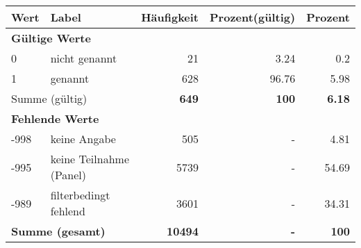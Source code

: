      \begin{longtable}{lXrrr}
     \toprule
     \textbf{Wert} & \textbf{Label} & \textbf{Häufigkeit} & \textbf{Prozent(gültig)} & \textbf{Prozent} \\
     \endhead
     \midrule
     \multicolumn{5}{l}{\textbf{Gültige Werte}}\\

     0 &
     \multicolumn{1}{X}{ nicht genannt   } &


       \num{21} &
       \num[round-mode=places,round-precision=2]{3,24} &
         \num[round-mode=places,round-precision=2]{0,2} \\

     1 &
     \multicolumn{1}{X}{ genannt   } &


       \num{628} &
       \num[round-mode=places,round-precision=2]{96,76} &
         \num[round-mode=places,round-precision=2]{5,98} \\
     \midrule
     \multicolumn{2}{l}{Summe (gültig)} &
       \textbf{\num{649}} &
     \textbf{100} &
       \textbf{\num[round-mode=places,round-precision=2]{6,18}} \\
     \multicolumn{5}{l}{\textbf{Fehlende Werte}}\\
       -998 &
       keine Angabe &
         \num{505} &
        - &
         \num[round-mode=places,round-precision=2]{4,81} \\
       -995 &
       keine Teilnahme (Panel) &
         \num{5739} &
        - &
         \num[round-mode=places,round-precision=2]{54,69} \\
       -989 &
       filterbedingt fehlend &
         \num{3601} &
        - &
         \num[round-mode=places,round-precision=2]{34,31} \\
     \midrule
     \multicolumn{2}{l}{\textbf{Summe (gesamt)}} &
          \textbf{\num{10494}} &
        \textbf{-} &
        \textbf{100} \\
     \bottomrule
     \end{longtable}
     
